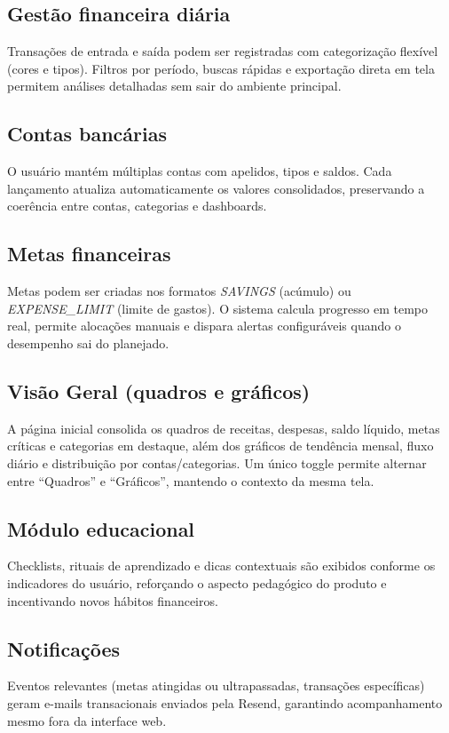 \subsection{Gestão financeira diária}
Transações de entrada e saída podem ser registradas com categorização flexível (cores e tipos). Filtros por período, buscas rápidas e exportação direta em tela permitem análises detalhadas sem sair do ambiente principal.

\subsection{Contas bancárias}
O usuário mantém múltiplas contas com apelidos, tipos e saldos. Cada lançamento atualiza automaticamente os valores consolidados, preservando a coerência entre contas, categorias e dashboards.

\subsection{Metas financeiras}
Metas podem ser criadas nos formatos \textit{SAVINGS} (acúmulo) ou \textit{EXPENSE\_LIMIT} (limite de gastos). O sistema calcula progresso em tempo real, permite alocações manuais e dispara alertas configuráveis quando o desempenho sai do planejado.

\subsection{Visão Geral (quadros e gráficos)}
A página inicial consolida os quadros de receitas, despesas, saldo líquido, metas críticas e categorias em destaque, além dos gráficos de tendência mensal, fluxo diário e distribuição por contas/categorias. Um único toggle permite alternar entre ``Quadros'' e ``Gráficos'', mantendo o contexto da mesma tela.

\subsection{Módulo educacional}
Checklists, rituais de aprendizado e dicas contextuais são exibidos conforme os indicadores do usuário, reforçando o aspecto pedagógico do produto e incentivando novos hábitos financeiros.

\subsection{Notificações}
Eventos relevantes (metas atingidas ou ultrapassadas, transações específicas) geram e\hyp mails transacionais enviados pela Resend, garantindo acompanhamento mesmo fora da interface web.

